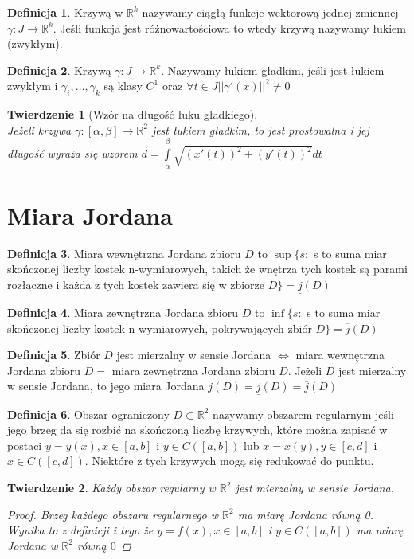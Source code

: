 \documentclass[12pt,a4paper]{article}
\newtheorem{tw}{Twierdzenie}
\theoremstyle{definition}
\newtheorem{df}{Definicja}
\begin{document}
\begin{df}
Krzywą w $\mathbb{R}^k$ nazywamy ciągłą funkcje wektorową jednej zmiennej $\gamma: J\to\mathbb{R}^k$. Jeśli funkcja jest różnowartościowa to wtedy krzywą nazywamy łukiem (zwykłym).
\end{df}
\begin{df}
Krzywą $\gamma: J\to\mathbb{R}^k$. Nazywamy łukiem gładkim, jeśli jest łukiem zwykłym i $\gamma_i, \dots ,\gamma_k$ są klasy $C^1$ oraz $\forall t\in J ||\gamma '(x)||^2 \neq 0$
\end{df}

\begin{tw}[Wzór na długość łuku gładkiego]~\\
Jeżeli krzywa $\gamma :[\alpha , \beta ] \to\mathbb{R}^2$ jest łukiem gładkim, to jest prostowalna i jej długość wyraża się wzorem $d = \int\limits_\alpha^\beta \sqrt{(x'(t))^2 + (y'(t))^2}dt$
\end{tw}

\section{Miara Jordana}
\begin{df}
Miara wewnętrzna Jordana zbioru $D$ to $\sup\{s:$ s to suma miar skończonej liczby kostek n-wymiarowych, takich że wnętrza tych kostek są parami rozłączne i każda z tych kostek zawiera się w zbiorze $D\} = \underline{j}(D)$
\end{df}
\begin{df}
Miara zewnętrzna Jordana zbioru $D$ to $\inf\{s:$ s to suma miar skończonej liczby kostek n-wymiarowych, pokrywających zbiór $ D\} = \overline{j}(D)$
\end{df}

\begin{df}
Zbiór $D$ jest mierzalny w sensie Jordana $\Leftrightarrow$ miara wewnętrzna Jordana zbioru $D = $ miara zewnętrzna Jordana zbioru $D$. 
Jeżeli $D$ jest mierzalny w sensie Jordana, to jego miara Jordana $j(D) = \underline{j}(D) = \overline{j}(D)$
\end{df}

\begin{df}
Obszar ograniczony $D\subset \mathbb{R}^2$ nazywamy obszarem regularnym jeśli jego brzeg da się rozbić na skończoną liczbę krzywych, które można zapisać w postaci $y=y(x), x\in [a,b]$ i $y\in C([a,b])$ lub $x=x(y), y\in [c,d]$ i $x\in C([c,d])$. Niektóre z tych krzywych mogą się redukować do punktu.
\end{df}
\begin{tw}
Każdy obszar regularny w $\mathbb{R}^2$ jest mierzalny w sensie Jordana.
\begin{proof}
Brzeg każdego obszaru regularnego w $\mathbb{R}^2$ ma miarę Jordana równą 0. Wynika to z definicji i tego że $y=f(x), x\in [a,b]$ i $y\in C([a,b])$ ma miarę Jordana w $\mathbb{R}^2$ równą $0$
\end{proof}
\end{tw}
\end{document}
